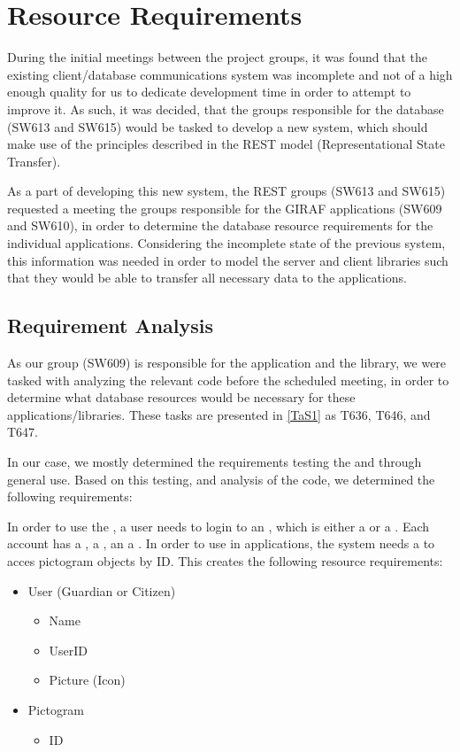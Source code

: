 \chapter{Resource Requirements}\label{S1CS}
During the initial meetings between the project groups, it was found that the
existing client/database communications system was incomplete and not of a high
enough quality for us to dedicate development time in order to attempt to
improve it. As such, it was decided, that the groups responsible for the
database (SW613 and SW615) would be tasked to develop a new system, which should
make use of the principles described in the REST model (Representational State
Transfer).\nl

As a part of developing this new system, the REST groups (SW613 and SW615)
requested a meeting the groups responsible for the GIRAF applications (SW609 and
SW610), in order to determine the database resource requirements for the
individual applications. Considering the incomplete state of the previous
system, this information was needed in order to model the server and client
libraries such that they would be able to transfer all necessary data to the
applications.\nl

\section{Requirement Analysis}
As our group (SW609) is responsible for the  application and the
 library, we were tasked with analyzing the relevant
code before the scheduled meeting, in order to determine what database
resources would be necessary for these applications/libraries. These tasks are
presented in \autoref{TaS1} as T636, T646, and T647.\nl

In our case, we mostly determined the requirements testing the 
and  through general use. Based on this testing, and 
analysis of the code, we determined the following requirements:\nl

In order to use the , a user needs to login to an
, which is either a  or a . Each account has a
, a , an a . In order to use
 in applications, the system needs a to acces pictogram
objects by ID.
This creates the following resource requirements:

\begin{itemize}
  \item User (Guardian or Citizen)
  	\begin{itemize}
  		\item Name
  		\item UserID
  		\item Picture (Icon) 
	\end{itemize}
  \item Pictogram
  	\begin{itemize}
  		\item ID
	\end{itemize}
\end{itemize}


